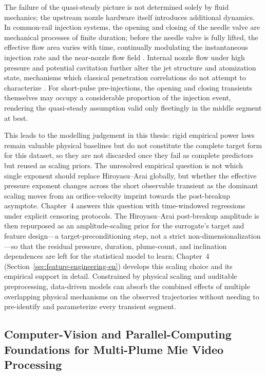 The failure of the quasi-steady picture is not determined solely by fluid mechanics; the upstream nozzle hardware itself introduces additional dynamics.
In common-rail injection systems, the opening and closing of the needle valve are mechanical processes of finite duration;
before the needle valve is fully lifted, the effective flow area varies with time, continually modulating the instantaneous injection rate and the near-nozzle flow field \cite{StumppRicco1996,HiroyasuArai1990}.
Internal nozzle flow under high pressure and potential cavitation further alter the jet structure and atomization state, mechanisms which classical penetration correlations do not attempt to characterize \cite{liu2020sprayreview}.
For short-pulse pre-injections, the opening and closing transients themselves may occupy a considerable proportion of the injection event, rendering the quasi-steady assumption valid only fleetingly in the middle segment at best.

This leads to the modelling judgement in this thesis: rigid empirical power laws remain valuable physical baselines but do not constitute the complete target form for this dataset, so they are not discarded once they fail as complete predictors but reused as scaling priors. The unresolved empirical question is not which single exponent should replace Hiroyasu--Arai globally, but whether the effective pressure exponent changes across the short observable transient as the dominant scaling moves from an orifice-velocity imprint towards the post-breakup asymptote. Chapter~4 answers this question with time-windowed regressions under explicit censoring protocols. The Hiroyasu--Arai post-breakup amplitude is then repurposed as an amplitude-scaling prior for the surrogate's target and feature design---a target-preconditioning step, not a strict non-dimensionalization---so that the residual pressure, duration, plume-count, and inclination dependences are left for the statistical model to learn; Chapter~4 (Section~\ref{sec:feature-engineering-en}) develops this scaling choice and its empirical support in detail. Constrained by physical scaling and auditable preprocessing, data-driven models can absorb the combined effects of multiple overlapping physical mechanisms on the observed trajectories without needing to pre-identify and parameterize every transient segment.

\subsection{Computer-Vision and Parallel-Computing Foundations for Multi-Plume Mie Video Processing}

